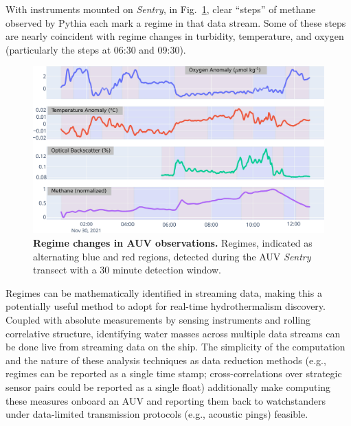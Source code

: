 With instruments mounted on \emph{Sentry}, in Fig.~\ref{fig:sentry_regimes}, clear ``steps'' of methane observed by Pythia each mark a regime in that data stream. Some of these steps are nearly coincident with regime changes in turbidity, temperature, and oxygen (particularly the steps at 06:30 and 09:30).  

\begin{figure}[h!]
    \centering
    \includegraphics[width=1\columnwidth]{figures/chap3_sentry_regimes.jpg}
    \caption[Regime changes in AUV \Sentry observations]{\textbf{Regime changes in AUV \Sentry observations.} Regimes, indicated as alternating blue and red regions, detected during the AUV \emph{Sentry} transect with a 30 minute detection window.}
    \label{fig:sentry_regimes}
\end{figure}

Regimes can be mathematically identified in streaming data, making this a potentially useful method to adopt for real-time hydrothermalism discovery. Coupled with absolute measurements by sensing instruments and rolling correlative structure, identifying water masses across multiple data streams can be done live from streaming data on the ship. The simplicity of the computation and the nature of these analysis techniques as data reduction methods (e.g., regimes can be reported as a single time stamp; cross-correlations over strategic sensor pairs could be reported as a single float) additionally make computing these measures onboard an AUV and reporting them back to watchstanders under data-limited transmission protocols (e.g., acoustic pings) feasible. 


